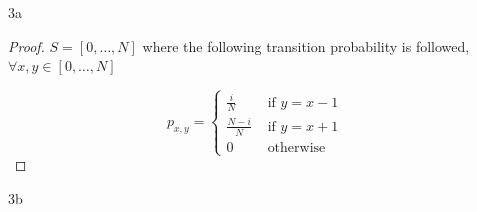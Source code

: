 \documentclass{article}
\begin{document}
\bigskip

\begin{PROB}{3a}\label{Problem 3a.}
\end{PROB}
\begin{proof}
    $S = [0, \dots, N]$ where the following transition probability is followed, $\forall x, y \in [0, \dots, N]$
    
    \[p_{x, y} = \begin{cases*}
        \frac{i}{N} & \text{ if $y = x - 1$ } \\
        \frac{N - i}{N} & \text{ if $y = x + 1$ } \\
        0 & \text{ otherwise}
    \end{cases*}\]
\end{proof}
\begin{PROB}{3b}\label{Problem 3b.}
\end{PROB}
\end{document}
